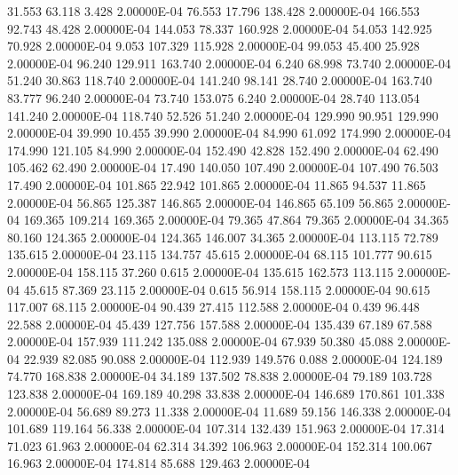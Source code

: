     31.553    63.118     3.428  2.00000E-04
    76.553    17.796   138.428  2.00000E-04
   166.553    92.743    48.428  2.00000E-04
   144.053    78.337   160.928  2.00000E-04
    54.053   142.925    70.928  2.00000E-04
     9.053   107.329   115.928  2.00000E-04
    99.053    45.400    25.928  2.00000E-04
    96.240   129.911   163.740  2.00000E-04
     6.240    68.998    73.740  2.00000E-04
    51.240    30.863   118.740  2.00000E-04
   141.240    98.141    28.740  2.00000E-04
   163.740    83.777    96.240  2.00000E-04
    73.740   153.075     6.240  2.00000E-04
    28.740   113.054   141.240  2.00000E-04
   118.740    52.526    51.240  2.00000E-04
   129.990    90.951   129.990  2.00000E-04
    39.990    10.455    39.990  2.00000E-04
    84.990    61.092   174.990  2.00000E-04
   174.990   121.105    84.990  2.00000E-04
   152.490    42.828   152.490  2.00000E-04
    62.490   105.462    62.490  2.00000E-04
    17.490   140.050   107.490  2.00000E-04
   107.490    76.503    17.490  2.00000E-04
   101.865    22.942   101.865  2.00000E-04
    11.865    94.537    11.865  2.00000E-04
    56.865   125.387   146.865  2.00000E-04
   146.865    65.109    56.865  2.00000E-04
   169.365   109.214   169.365  2.00000E-04
    79.365    47.864    79.365  2.00000E-04
    34.365    80.160   124.365  2.00000E-04
   124.365   146.007    34.365  2.00000E-04
   113.115    72.789   135.615  2.00000E-04
    23.115   134.757    45.615  2.00000E-04
    68.115   101.777    90.615  2.00000E-04
   158.115    37.260     0.615  2.00000E-04
   135.615   162.573   113.115  2.00000E-04
    45.615    87.369    23.115  2.00000E-04
     0.615    56.914   158.115  2.00000E-04
    90.615   117.007    68.115  2.00000E-04
    90.439    27.415   112.588  2.00000E-04
     0.439    96.448    22.588  2.00000E-04
    45.439   127.756   157.588  2.00000E-04
   135.439    67.189    67.588  2.00000E-04
   157.939   111.242   135.088  2.00000E-04
    67.939    50.380    45.088  2.00000E-04
    22.939    82.085    90.088  2.00000E-04
   112.939   149.576     0.088  2.00000E-04
   124.189    74.770   168.838  2.00000E-04
    34.189   137.502    78.838  2.00000E-04
    79.189   103.728   123.838  2.00000E-04
   169.189    40.298    33.838  2.00000E-04
   146.689   170.861   101.338  2.00000E-04
    56.689    89.273    11.338  2.00000E-04
    11.689    59.156   146.338  2.00000E-04
   101.689   119.164    56.338  2.00000E-04
   107.314   132.439   151.963  2.00000E-04
    17.314    71.023    61.963  2.00000E-04
    62.314    34.392   106.963  2.00000E-04
   152.314   100.067    16.963  2.00000E-04
   174.814    85.688   129.463  2.00000E-04

